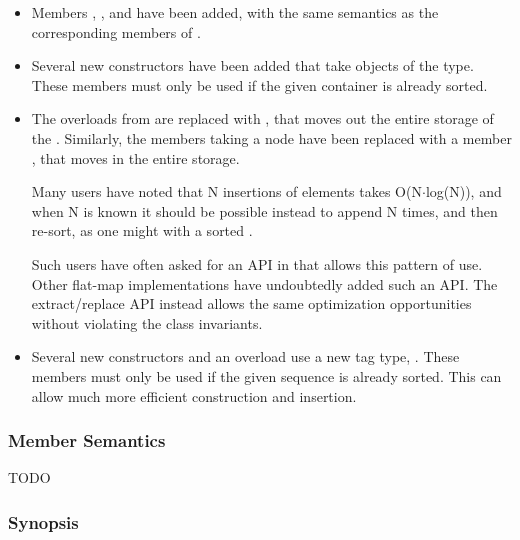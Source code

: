 \begin{itemize}
  \item Members , , and 
    have been added, with the same semantics as the corresponding members of
    .

  \item Several new constructors have been added that take objects of the
     type.  These members must only be used if the given
    container is already sorted.

  \item The  overloads from  are replaced with
    , that moves out the entire storage of the
    .  Similarly, the  members taking a node
    have been replaced with a member , that
    moves in the entire storage.

    Many users have noted that N insertions of elements takes
    O(N$\cdot$log(N)), and when N is known it should be possible instead to
    append N times, and then re-sort, as one might with a sorted
    .

    Such users have often asked for an API in
     that allows this pattern of use.  Other
    flat-map implementations have undoubtedly added such an API.  The
    extract/replace API instead allows the same optimization opportunities
    without violating the class invariants.

  \item Several new constructors and an  overload use a new tag
    type, .  These members must only be used
    if the given sequence is already sorted.  This can allow much more
    efficient construction and insertion.
\end{itemize}

\subsubsection{Member Semantics}

TODO

\subsubsection{ Synopsis}


